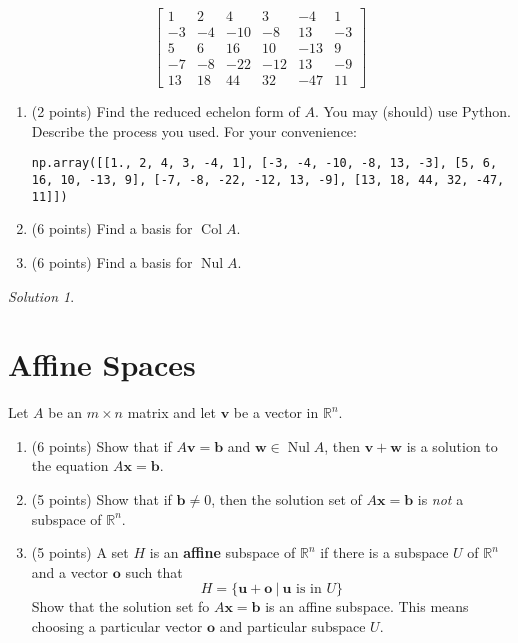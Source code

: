 \documentclass{article}
\theoremstyle{remark}
\newtheorem*{solution}{Solution}
\newcommand{\vv}[1]{\mathbf{#1}}
\newcommand{\R}{\mathbb R}
\DeclareMathOperator{\col}{Col}
\DeclareMathOperator{\nul}{Nul}
\begin{document}
\begin{displaymath}
  \begin{bmatrix}
    1 & 2 & 4 & 3 & -4 & 1 \\
    -3 & -4 & -10 & -8 & 13 & -3 \\
    5 & 6 & 16 & 10 & -13 & 9 \\
    -7 & -8 & -22 & -12 & 13 & -9 \\
    13 & 18 & 44 & 32 & -47 & 11
  \end{bmatrix}
\end{displaymath}

\begin{enumerate}
\item (2 points) Find the reduced echelon form of $A$. You may (should) use Python. Describe the process you used. For your convenience:
  \begin{lstlisting}
np.array([[1., 2, 4, 3, -4, 1], [-3, -4, -10, -8, 13, -3], [5, 6, 16, 10, -13, 9], [-7, -8, -22, -12, 13, -9], [13, 18, 44, 32, -47, 11]])\end{lstlisting}
\item (6 points) Find a basis for $\col A$.
\item (6 points) Find a basis for $\nul A$.
\end{enumerate}
\medskip

\begin{solution}
\end{solution}

\pagebreak
\section{Affine Spaces}
Let $A$ be an $m \times n$ matrix and let $\vv v$ be a vector in $\R^n$.
\begin{enumerate}
\item (6 points) Show that if $A\vv v = \vv b$ and $\vv w \in \nul A$, then $\vv v + \vv w$ is a solution to the equation $A\vv x = \vv b$.
\item (5 points) Show that if $\vv b \not = 0$, then the solution set of $A\vv x = \vv b$ is \textit{not} a subspace of $\R^n$.
\item (5 points) A set $H$ is an \textbf{affine} subspace of $\R^n$ if there is a subspace $U$ of $\R^n$ and a vector $\vv o$ such that
  \begin{displaymath}
    H = \{\vv u + \vv o \ | \ \vv u \text{ is in } U\}
  \end{displaymath}
  Show that the solution set fo $A\vv x = \vv b$ is an affine subspace.
  This means choosing a particular vector $\vv o$ and particular subspace $U$.
\end{enumerate}
\end{document}
